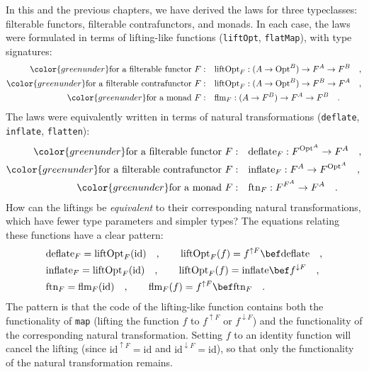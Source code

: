 In this and the previous chapters, we have derived the laws for three
typeclasses: filterable functors, filterable contrafunctors, and monads.
In each case, the laws were formulated in terms of lifting-like functions
(\lstinline!liftOpt!, \lstinline!flatMap!), with type signatures:
\begin{align*}
{\color{greenunder}\text{for a filterable functor }F:}\quad & \text{liftOpt}_{F}:(A\rightarrow\text{Opt}^{B})\rightarrow F^{A}\rightarrow F^{B}\quad,\\
{\color{greenunder}\text{for a filterable contrafunctor }F:}\quad & \text{liftOpt}_{F}:(A\rightarrow\text{Opt}^{B})\rightarrow F^{B}\rightarrow F^{A}\quad,\\
{\color{greenunder}\text{for a monad }F:}\quad & \text{flm}_{F}:(A\rightarrow F^{B})\rightarrow F^{A}\rightarrow F^{B}\quad.
\end{align*}
The laws were equivalently written in terms of natural transformations
(\lstinline!deflate!, \lstinline!inflate!, \lstinline!flatten!):
\begin{align*}
{\color{greenunder}\text{for a filterable functor }F:}\quad & \text{deflate}_{F}:F^{\text{Opt}^{A}}\rightarrow F^{A}\quad,\\
{\color{greenunder}\text{for a filterable contrafunctor }F:}\quad & \text{inflate}_{F}:F^{A}\rightarrow F^{\text{Opt}^{A}}\quad,\\
{\color{greenunder}\text{for a monad }F:}\quad & \text{ftn}_{F}:F^{F^{A}}\rightarrow F^{A}\quad.
\end{align*}
How can the liftings be \emph{equivalent} to their corresponding natural
transformations, which have fewer type parameters and simpler types?
The equations relating these functions have a clear pattern:
\begin{align*}
 & \text{deflate}_{F}=\text{liftOpt}_{F}(\text{id})\quad,\quad\quad\text{liftOpt}_{F}(f)=f^{\uparrow F}\bef\text{deflate}\quad,\\
 & \text{inflate}_{F}=\text{liftOpt}_{F}(\text{id})\quad,\quad\quad\text{liftOpt}_{F}(f)=\text{inflate}\bef f^{\downarrow F}\quad,\\
 & \text{ftn}_{F}=\text{flm}_{F}(\text{id})\quad,\quad\quad\text{flm}_{F}(f)=f^{\uparrow F}\bef\text{ftn}_{F}\quad.
\end{align*}
The pattern is that the code of the lifting-like function contains
both the functionality of \lstinline!map! (lifting the function $f$
to $f^{\uparrow F}$ or $f^{\downarrow F}$) and the functionality
of the corresponding natural transformation. Setting $f$ to an identity
function will cancel the lifting (since $\text{id}^{\uparrow F}=\text{id}$
and $\text{id}^{\downarrow F}=\text{id}$), so that only the functionality
of the natural transformation remains.

